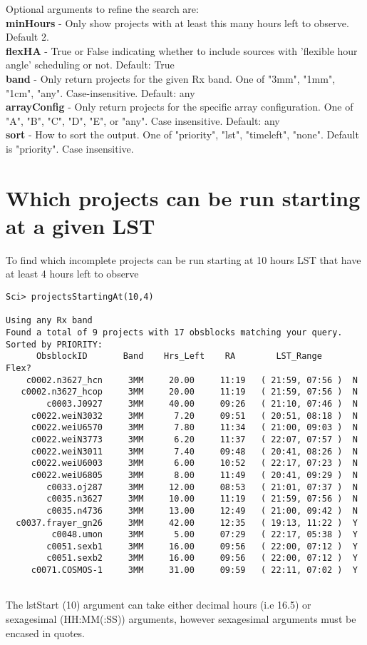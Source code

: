 \documentclass[preprint]{aastex} %
\begin{document}
\noindent Optional arguments to refine the search are:\\
{\bf minHours} - Only show projects with at least this many hours left to observe. Default 2.\\
{\bf flexHA} - True or False indicating whether to include sources with 'flexible hour angle' scheduling or not. Default: True\\
{\bf band} - Only return projects for the given Rx band. One of "3mm", "1mm", "1cm", "any". Case-insensitive. Default: any\\
{\bf arrayConfig} - Only return projects for the specific array configuration.
One of "A", "B", "C", "D", "E", or "any".  Case insensitive. Default: any\\
{\bf sort} - How to sort the output. One of "priority", "lst", "timeleft", "none".  Default is "priority".  Case insensitive.

\section{Which projects can be run starting at a given LST}
To find which incomplete projects can be run starting at 10 hours LST
that have at least 4 hours left to observe
\begin{verbatim}
Sci> projectsStartingAt(10,4)

Using any Rx band 
Found a total of 9 projects with 17 obsblocks matching your query.
Sorted by PRIORITY:
      ObsblockID       Band    Hrs_Left    RA        LST_Range    Flex?
    c0002.n3627_hcn     3MM     20.00     11:19   ( 21:59, 07:56 )  N
   c0002.n3627_hcop     3MM     20.00     11:19   ( 21:59, 07:56 )  N
        c0003.J0927     3MM     40.00     09:26   ( 21:10, 07:46 )  N
     c0022.weiN3032     3MM      7.20     09:51   ( 20:51, 08:18 )  N
     c0022.weiU6570     3MM      7.80     11:34   ( 21:00, 09:03 )  N
     c0022.weiN3773     3MM      6.20     11:37   ( 22:07, 07:57 )  N
     c0022.weiN3011     3MM      7.40     09:48   ( 20:41, 08:26 )  N
     c0022.weiU6003     3MM      6.00     10:52   ( 22:17, 07:23 )  N
     c0022.weiU6805     3MM      8.00     11:49   ( 20:41, 09:29 )  N
        c0033.oj287     3MM     12.00     08:53   ( 21:01, 07:37 )  N
        c0035.n3627     3MM     10.00     11:19   ( 21:59, 07:56 )  N
        c0035.n4736     3MM     13.00     12:49   ( 21:00, 09:42 )  N
  c0037.frayer_gn26     3MM     42.00     12:35   ( 19:13, 11:22 )  Y
         c0048.umon     3MM      5.00     07:29   ( 22:17, 05:38 )  Y
        c0051.sexb1     3MM     16.00     09:56   ( 22:00, 07:12 )  Y
        c0051.sexb2     3MM     16.00     09:56   ( 22:00, 07:12 )  Y
     c0071.COSMOS-1     3MM     31.00     09:59   ( 22:11, 07:02 )  Y


\end{verbatim}
\noindent The lstStart (10) argument can take either decimal hours (i.e 16.5) or sexagesimal (HH:MM(:SS)) arguments, however sexagesimal arguments must be encased in quotes.
\end{document}
